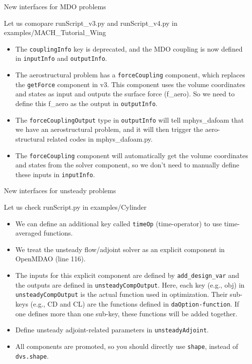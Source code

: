 \documentclass{bredelebeamer}
\begin{document}
\begin{frame}{New interfaces for MDO problems}

  Let us comopare runScript\_v3.py and runScript\_v4.py in examples/MACH\_Tutorial\_Wing
  
  \begin{itemize}
  
    \item The \texttt{couplingInfo} key is deprecated, and the MDO coupling is now defined in \texttt{inputInfo} and \texttt{outputInfo}.
    \item The aerostructural problem has a \texttt{forceCoupling} component, which replaces the \texttt{getForce} component in v3. This component uses the volume coordinates and states as input and outputs the surface force (f\_aero). So we need to define this f\_aero as the output in \texttt{outputInfo}. 
    \item The \texttt{forceCouplingOutput} type in \texttt{outputInfo} will tell mphys\_dafoam that we have an aerostructural problem, and it will then trigger the aero-structural related codes in mphys\_dafoam.py.
    \item The \texttt{forceCoupling} component will automatically get the volume coordinates and states from the solver component, so we don't need to manually define these inputs in \texttt{inputInfo}.
    
    
\end{itemize}
\end{frame}

\begin{frame}{New interfaces for unsteady problems}

   Let us check runScript.py in examples/Cylinder
  
  \begin{itemize}
  \item We can define an additional key called \texttt{timeOp} (time-operator) to use time-averaged functions.
  \item We treat the unsteady flow/adjoint solver as an explicit component in OpenMDAO (line 116).
  \item The inputs for this explicit component are defined by \texttt{add\_design\_var} and the outputs are defined in \texttt{unsteadyCompOutput}. Here, each key (e.g., obj) in \texttt{unsteadyCompOutput} is the actual function used in optimization. Their sub-keys (e.g., CD and CL) are the functions defined in \texttt{daOption-function}. If one defines more than one sub-key, these functions will be added together.  
   \item Define unsteady adjoint-related parameters in \texttt{unsteadyAdjoint}.
   \item All components are promoted, so you should directly use \texttt{shape}, instead of \texttt{dvs.shape}.
    
\end{itemize}
\end{frame}
\end{document}
